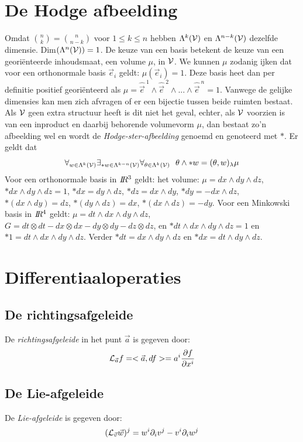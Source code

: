 \documentclass[twoside]{report}
\begin{document}
\section{De Hodge afbeelding}
Omdat ${n\choose k}={n\choose{n-k}}$ voor $1\leq k\leq n$ hebben
$\Lambda^k(\cal V)$ en $\Lambda^{n-k}(\cal V)$ dezelfde dimensie.
Dim$(\Lambda^n({\cal V}))=1$. De keuze van een basis betekent de keuze van een
geori\"enteerde inhoudsmaat, een volume $\mu$, in $\cal V$. We kunnen $\mu$
zodanig ijken dat voor een orthonormale basis $\vec{e}_i$ geldt:
$\mu(\vec{e}_i)=1$. Deze basis heet dan per definitie positief geori\"enteerd
als $\mu=\hat{\vec{e}}^{~1}\wedge \hat{\vec{e}}^{~2}\wedge...\wedge \hat{\vec{e}}^{~n}=1$.
\npar
Vanwege de gelijke dimensies kan men zich afvragen of er een bijectie tussen
beide ruimten bestaat. Als $\cal V$ geen extra structuur heeft is dit niet
het geval, echter, als $\cal V$ voorzien is van een inproduct en daarbij
behorende volumevorm $\mu$, dan bestaat zo'n afbeelding wel en wordt de
{\it Hodge-ster-afbeelding} genoemd en genoteerd met $*$. Er geldt dat
\[
\forall_{w\in\Lambda^k({\cal V})}\exists_{*w\in\Lambda^{k-n}({\cal V})}\forall_{\theta\in\Lambda^k({\cal V})}~~
\theta\wedge*w=(\theta,w)_\lambda\mu
\]
Voor een orthonormale basis in $I\hspace{-1mm}R^3$ geldt: het volume: $\mu=dx\wedge dy\wedge dz$,
$*dx\wedge dy\wedge dz=1$, $*dx=dy\wedge dz$, $*dz=dx\wedge dy$, $*dy=-dx\wedge dz$,
$*(dx\wedge dy)=dz$, $*(dy\wedge dz)=dx$, $*(dx\wedge dz)=-dy$.
\npar
Voor een Minkowski basis in $I\hspace{-1mm}R^4$ geldt: $\mu=dt\wedge dx\wedge dy\wedge dz$,
$G=dt\otimes dt-dx\otimes dx-dy\otimes dy-dz\otimes dz$, en
$*dt\wedge dx\wedge dy\wedge dz=1$ en $*1=dt\wedge dx\wedge dy\wedge dz$. Verder
$*dt=dx\wedge dy\wedge dz$ en $*dx=dt\wedge dy\wedge dz$.

\section{Differentiaaloperaties}
\subsection{De richtingsafgeleide}
De {\it richtingsafgeleide} in het punt $\vec{a}$ is gegeven door:
\[
{\cal L}_{\vec{a}}f=<\vec{a},df>=a^i\frac{\partial f}{\partial x^i}
\]

\subsection{De Lie-afgeleide}
De {\it Lie-afgeleide} is gegeven door:
\[
({\cal L}_{\vec{v}}\vec{w})^j=w^i\partial_iv^j-v^i\partial_iw^j
\]
\end{document}
